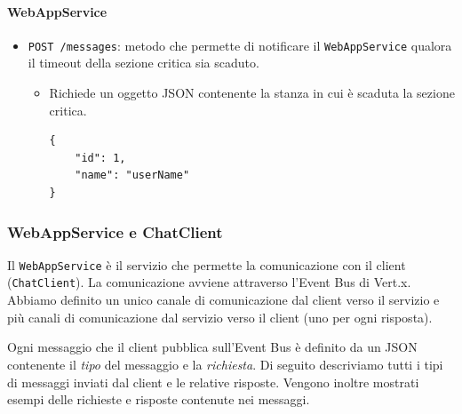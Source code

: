 \documentclass[a4paper]{article}
\begin{document}
\paragraph{WebAppService}
\begin{itemize}
    \item \texttt{POST /messages}: metodo che permette di notificare il \texttt{WebAppService} qualora il timeout della sezione critica sia scaduto.
    \begin{itemize}
        \item Richiede un oggetto JSON contenente la stanza in cui è scaduta la sezione critica.
        \begin{verbatim}
{
    "id": 1,
    "name": "userName"
}
        \end{verbatim}
    \end{itemize}
\end{itemize}

\subsubsection{WebAppService e ChatClient}
Il \texttt{WebAppService} è il servizio che permette la comunicazione con il client (\texttt{ChatClient}).
La comunicazione avviene attraverso l'Event Bus di Vert.x.
Abbiamo definito un unico canale di comunicazione dal client verso il servizio e più canali di comunicazione dal servizio verso il client (uno per ogni risposta). 

Ogni messaggio che il client pubblica sull'Event Bus è definito da un JSON contenente il \textit{tipo} del messaggio e la \textit{richiesta}.
Di seguito descriviamo tutti i tipi di messaggi inviati dal client e le relative risposte. Vengono inoltre mostrati esempi delle richieste e risposte contenute nei messaggi.
\end{document}
